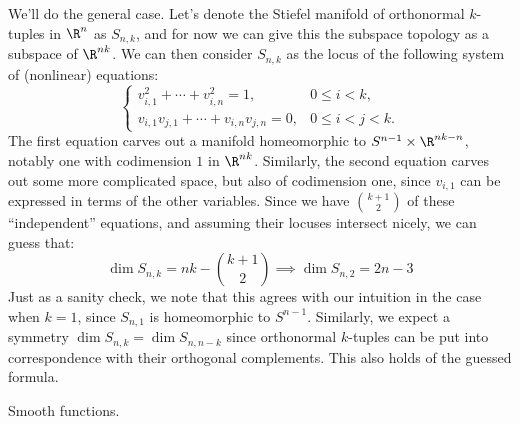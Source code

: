 \documentclass[11pt,letterpaper]{article}
\begin{document}
\begin{solution}
    \quad We'll do the general case. Let's denote the Stiefel manifold of orthonormal $k$-tuples in $\R^n$ as $S_{n,k}$, and for now we can give this the subspace topology as a subspace of $\R^{nk}$. We can then consider $S_{n,k}$ as the locus of the following system of (nonlinear) equations:
    \[
        \begin{cases}
            v_{i,1}^2 + \cdots + v_{i,n}^2 = 1,& 0\leq i < k,\\
            v_{i,1}v_{j,1} + \cdots + v_{i,n}v_{j,n} = 0,& 0\leq i < j < k.
        \end{cases}
    \] 
    The first equation carves out a manifold homeomorphic to $S^{n-1}\times \R^{nk-n}$, notably one with codimension $1$ in $\R^{nk}$. Similarly, the second equation carves out some more complicated space, but also of codimension one, since $v_{i,1}$ can be expressed in terms of the other variables. Since we have $\binom{k+1}{2}$ of these ``independent'' equations, and assuming their locuses intersect nicely, we can guess that:
    \[
        \boxed{\dim S_{n,k} = nk - \binom{k+1}{2}} \implies \dim S_{n,2} = 2n-3
    \] 
    \quad Just as a sanity check, we note that this agrees with our intuition in the case when $k=1$, since $S_{n,1}$ is homeomorphic to $S^{n-1}$. Similarly, we expect a symmetry $\dim S_{n,k} = \dim S_{n,n-k}$ since orthonormal $k$-tuples can be put into correspondence with their orthogonal complements. This also holds of the guessed formula.   
\end{solution}

\begin{problem}
    Smooth functions.
\end{problem}
\end{document}
